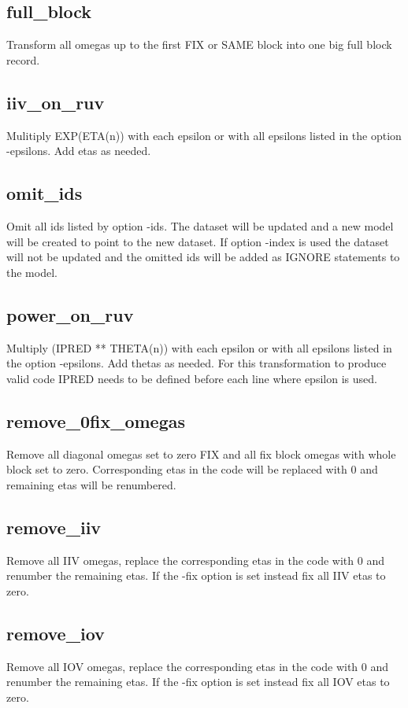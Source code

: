 \subsection{full\_block}
Transform all omegas up to the first FIX or SAME block into one big full block record.

\subsection{iiv\_on\_ruv}
Mulitiply EXP(ETA(n)) with each epsilon or with all epsilons listed in the option -epsilons. Add etas as needed.

\subsection{omit\_ids}
Omit all ids listed by option -ids. The dataset will be updated and a new model will be created to point to the new dataset. If option -index is used the dataset will not be updated and the omitted ids will be added as IGNORE statements to the model.

\subsection{power\_on\_ruv}
Multiply (IPRED ** THETA(n)) with each epsilon or with all epsilons listed in the option -epsilons. Add thetas as needed. For this transformation to produce valid code IPRED needs to be defined before each line where epsilon is used.

\subsection{remove\_0fix\_omegas}
Remove all diagonal omegas set to zero FIX and all fix block omegas with whole block set to zero. Corresponding etas in the code will be replaced with 0 and remaining etas will be renumbered.

\subsection{remove\_iiv}
Remove all IIV omegas, replace the corresponding etas in the code with 0 and renumber the remaining etas. If the -fix option is set instead fix all IIV etas to zero.

\subsection{remove\_iov}
Remove all IOV omegas, replace the corresponding etas in the code with 0 and renumber the remaining etas. If the -fix option is set instead fix all IOV etas to zero.

